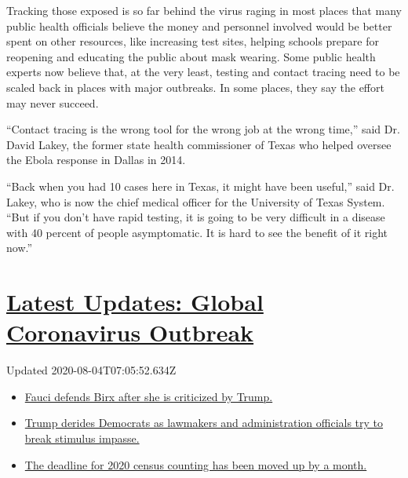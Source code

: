 Tracking those exposed is so far behind the virus raging in most places
that many public health officials believe the money and personnel
involved would be better spent on other resources, like increasing test
sites, helping schools prepare for reopening and educating the public
about mask wearing. Some public health experts now believe that, at the
very least, testing and contact tracing need to be scaled back in places
with major outbreaks. In some places, they say the effort may never
succeed.

``Contact tracing is the wrong tool for the wrong job at the wrong
time,'' said Dr. David Lakey, the former state health commissioner of
Texas who helped oversee the Ebola response in Dallas in 2014.

``Back when you had 10 cases here in Texas, it might have been useful,''
said Dr. Lakey, who is now the chief medical officer for the University
of Texas System. ``But if you don't have rapid testing, it is going to
be very difficult in a disease with 40 percent of people asymptomatic.
It is hard to see the benefit of it right now.''

\hypertarget{latest-updates-global-coronavirus-outbreak}{%
\section{\texorpdfstring{\href{https://www.nytimes.com/2020/08/03/world/coronavirus-covid-19.html?action=click\&pgtype=Article\&state=default\&region=MAIN_CONTENT_1\&context=storylines_live_updates}{Latest
Updates: Global Coronavirus
Outbreak}}{Latest Updates: Global Coronavirus Outbreak}}\label{latest-updates-global-coronavirus-outbreak}}

Updated 2020-08-04T07:05:52.634Z

\begin{itemize}
\tightlist
\item
  \href{https://www.nytimes.com/2020/08/03/world/coronavirus-covid-19.html?action=click\&pgtype=Article\&state=default\&region=MAIN_CONTENT_1\&context=storylines_live_updates\#link-4547638f}{Fauci
  defends Birx after she is criticized by Trump.}
\item
  \href{https://www.nytimes.com/2020/08/03/world/coronavirus-covid-19.html?action=click\&pgtype=Article\&state=default\&region=MAIN_CONTENT_1\&context=storylines_live_updates\#link-15e7f995}{Trump
  derides Democrats as lawmakers and administration officials try to
  break stimulus impasse.}
\item
  \href{https://www.nytimes.com/2020/08/03/world/coronavirus-covid-19.html?action=click\&pgtype=Article\&state=default\&region=MAIN_CONTENT_1\&context=storylines_live_updates\#link-e5a2cda}{The
  deadline for 2020 census counting has been moved up by a month.}
\end{itemize}

